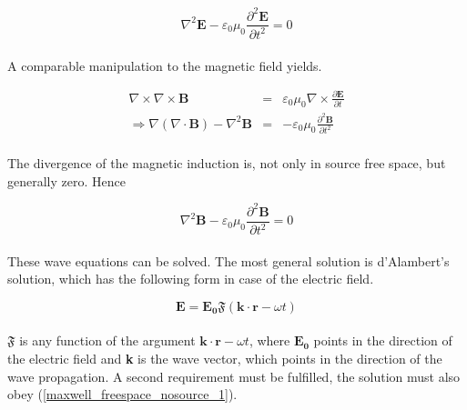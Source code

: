 \documentclass[a4paper,10pt]{thesis}
\begin{document}
\begin{equation}\label{wave_equation_E}
\nabla^2 \mathbf{E}-\varepsilon_0 \mu_0 \frac{\partial^2 \mathbf{E}}{\partial t^2}=0
\end{equation}

\paragraph*{}
A comparable manipulation to the magnetic field yields.

\begin{eqnarray}
\nabla \times \nabla \times \mathbf{B}&=& \varepsilon_0 \mu_0 \nabla \times \frac{\partial \mathbf{E}}{\partial t} \\
\Rightarrow \nabla ( \nabla \cdot \mathbf{B})- \nabla^2 \mathbf{B}&=& -\varepsilon_0 \mu_0  \frac{\partial^2 \mathbf{B}}{\partial t^2}
\end{eqnarray}

\paragraph*{}
The divergence of the magnetic induction is, not only in source free space, but generally zero. Hence

\begin{equation}\label{wave_equation_B}
\nabla^2 \mathbf{B}-\varepsilon_0 \mu_0 \frac{\partial^2 \mathbf{B}}{\partial t^2}=0
\end{equation}

\paragraph*{}
These wave equations can be solved. The most general solution is d'Alambert's solution, which has the following form  in case of the electric field.

\begin{equation}\label{dAlambert}
\mathbf{E}=\mathbf{E_0}\mathfrak{F}(\mathbf{k}\cdot \mathbf{r} - \omega t)
\end{equation}

\paragraph*{}
$\mathfrak{F}$ is any function of the argument $\mathbf{k}\cdot \mathbf{r}-\omega t$, where $\mathbf{E_0}$ points in the direction of the electric field and \textbf{k} is the wave vector, which points in the direction of the wave propagation. A second requirement must be fulfilled, the solution must also obey (\ref{maxwell_freespace_nosource_1}).
\end{document}
